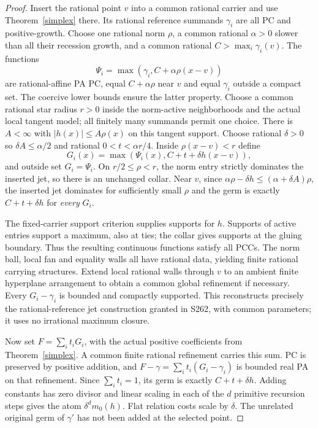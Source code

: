 \documentclass[11pt]{article}
\begin{document}
\begin{proof}
Insert the rational point $v$ into a common rational carrier and
use Theorem~\ref{simplex} there. Its rational reference summands
$\gamma_i$ are all PC and positive-growth. Choose one rational
norm $\rho$, a common rational $\alpha>0$ slower than all their
recession growth, and a common rational $C>\max_i\gamma_i(v)$.
The functions
\[
 \Psi_i=\max(\gamma_i,C+\alpha\rho(x-v))
\]
are rational-affine PA PC, equal $C+\alpha\rho$ near $v$ and
equal $\gamma_i$ outside a compact set. The coercive lower bounds
ensure the latter property. Choose a common rational star radius
$r>0$ inside the norm-active neighborhoods and the actual local
tangent model; all finitely many summands permit one choice.
There is $A<\infty$ with $|h(x)|\leq A\rho(x)$ on this tangent
support. Choose rational $\delta>0$ so $\delta A\leq\alpha/2$
and rational $0<t<\alpha r/4$. Inside $\rho(x-v)<r$ define
\[
 G_i(x)=\max(\Psi_i(x),C+t+\delta h(x-v)),
\]
and outside set $G_i=\Psi_i$.
On $r/2\leq\rho<r$, the norm entry strictly dominates the inserted
jet, so there is an unchanged collar. Near $v$, since
$\alpha\rho-\delta h\leq(\alpha+\delta A)\rho$, the inserted jet
dominates for sufficiently small $\rho$ and the germ is exactly
$C+t+\delta h$ for \emph{every} $G_i$.

The fixed-carrier support criterion supplies supports for $h$.
Supports of active entries support a maximum, also at ties; the
collar gives supports at the gluing boundary. Thus the resulting
continuous functions satisfy all PCCs. The norm ball, local fan
and equality walls all have rational data, yielding finite
rational carrying structures. Extend local rational walls through
$v$ to an ambient finite hyperplane arrangement to obtain a common
global refinement if necessary. Every $G_i-\gamma_i$ is bounded
and compactly supported. This reconstructs precisely the
rational-reference jet construction granted in S262, with common
parameters; it uses no irrational maximum closure.

Now set $F=\sum_i t_i G_i$, with the actual positive coefficients
from Theorem~\ref{simplex}. A common finite rational refinement
carries this sum. PC is preserved by positive addition, and
$F-\gamma=\sum_i t_i(G_i-\gamma_i)$ is bounded real PA on that
refinement. Since $\sum_i t_i=1$, its germ is exactly
$C+t+\delta h$. Adding constants has zero divisor and linear
scaling in each of the $d$ primitive recursion steps gives the
atom $\delta^d m_0(h)$. Flat relation costs scale by $\delta$.
The unrelated original germ of $\gamma'$ has not been added at
the selected point.


\end{proof}
\end{document}
